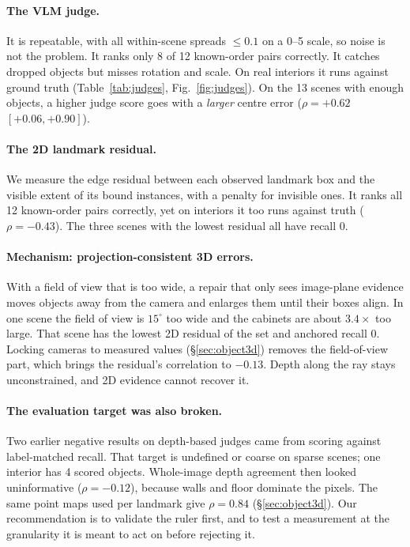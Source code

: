 \documentclass[10pt,twocolumn]{article}
\begin{document}
\paragraph{The VLM judge.} It is repeatable, with all within-scene spreads $\le0.1$ on a 0--5 scale, so noise is not the problem. It ranks
only 8 of 12 known-order pairs correctly. It catches dropped objects but misses rotation and scale. On real interiors it runs against
ground truth (Table~\ref{tab:judges}, Fig.~\ref{fig:judges}). On the 13 scenes with enough objects, a higher judge score goes with a
\emph{larger} centre error ($\rho=+0.62$ $[+0.06,+0.90]$).
\paragraph{The 2D landmark residual.} We measure the edge residual between each observed landmark box and the visible extent of its bound
instances, with a penalty for invisible ones. It ranks all 12 known-order pairs correctly, yet on interiors it too runs against truth
($\rho=-0.43$). The three scenes with the lowest residual all have recall 0.
\paragraph{Mechanism: projection-consistent 3D errors.} With a field of view that is too wide, a repair that only sees image-plane
evidence moves objects away from the camera and enlarges them until their boxes align. In one scene the field of view is $15^\circ$ too
wide and the cabinets are about $3.4\times$ too large. That scene has the lowest 2D residual of the set and anchored recall 0. Locking
cameras to measured values (\S\ref{sec:object3d}) removes the field-of-view part, which brings the residual's correlation to $-0.13$.
Depth along the ray stays unconstrained, and 2D evidence cannot recover it.
\paragraph{The evaluation target was also broken.} Two earlier negative results on depth-based judges came from scoring against
label-matched recall. That target is undefined or coarse on sparse scenes; one interior has 4 scored objects. Whole-image depth
agreement then looked uninformative ($\rho=-0.12$), because walls and floor dominate the pixels. The same point maps used per landmark
give $\rho=0.84$ (\S\ref{sec:object3d}). Our recommendation is to validate the ruler first, and to test a measurement at the granularity
it is meant to act on before rejecting it.
\end{document}
